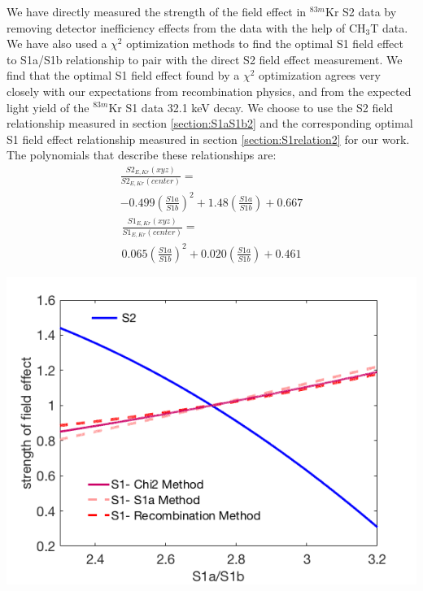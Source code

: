 We have directly measured the strength of the field effect in $^{83m}$Kr S2 data by removing detector inefficiency effects from the data with the help of CH$_3$T data.  We have also used a $\chi^2$ optimization methods to find the optimal S1 field effect to S1a/S1b relationship to pair with the direct S2 field effect measurement.  We find that the optimal S1 field effect found by a $\chi^2$ optimization agrees very closely with our expectations from recombination physics, and from the expected light yield of the $^{83m}$Kr S1 data 32.1 keV decay.   We choose to use the S2 field relationship measured in section \ref{section:S1aS1b2} and the corresponding optimal S1 field effect relationship measured in section \ref{section:S1relation2} for our work.  The polynomials that describe these relationships are:
\begin{multline}
\frac{S2_{E,Kr}(xyz)}{S2_{E,Kr}(center)} =   \\ -0.499 \left(\frac{S1a}{S1b} \right)^2 + 1.48  \left(\frac{S1a}{S1b} \right) + 0.667
\end{multline}
\begin{multline}
\frac{S1_{E,Kr}(xyz)}{S1_{E,Kr}(center)} = \\  0.065 \left(\frac{S1a}{S1b} \right)^2 + 0.020 \left(\frac{S1a}{S1b} \right) + 0.461
\end{multline}


\begin{center}
\includegraphics[scale=0.4]{figures/StrengthOfFieldEffectOverlay.png}
 \label{AllMeasurements}
\end{center}


